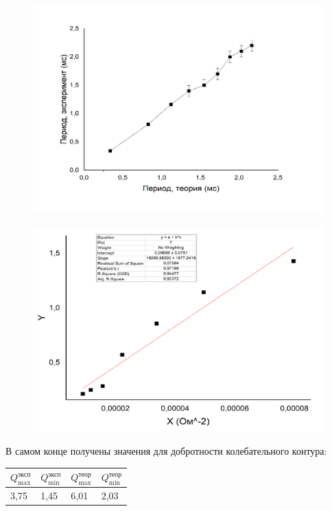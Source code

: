 \documentclass[a4paper,12pt]{article}
\begin{document}
\begin{figure}[h!]
\includegraphics{Рис2.png}
\caption{}
\label{fig2}
\end{figure}
\begin{figure}[h!]
	\includegraphics{Рис3.png}
	\caption{}
	\label{fig3}
\end{figure}
\newpage

В самом конце получены значения для добротности колебательного контура:

	\begin{table}[h]
		\begin{center}
		\begin{tabular}{|l|l|l|l|}
			\hline
		$Q_\text{max}^\text{эксп}$ & $Q_\text{min}^\text{эксп}$ & $Q_\text{max}^\text{теор}$ & $Q_\text{min}^\text{теор}$ \\ \hline
		3,75	&  1,45 & 6,01 & 2,03 \\ \hline
		\end{tabular}
	\end{center}
	\end{table}
\end{document}
